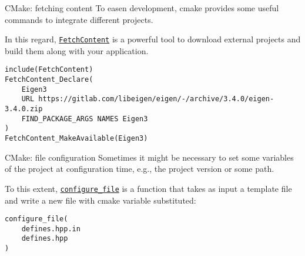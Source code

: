 \begin{frame}[fragile]{CMake: fetching content}
    To easen development, cmake provides some useful commands to integrate different projects.

    In this regard, \href{https://cmake.org/cmake/help/latest/module/FetchContent.html}{\texttt{FetchContent}} is a powerful tool to download external projects and build them along with your application.

\begin{lstlisting}
include(FetchContent)
FetchContent_Declare(
    Eigen3
    URL https://gitlab.com/libeigen/eigen/-/archive/3.4.0/eigen-3.4.0.zip
    FIND_PACKAGE_ARGS NAMES Eigen3
)
FetchContent_MakeAvailable(Eigen3)
\end{lstlisting}
\end{frame}

\begin{frame}[fragile]{CMake: file configuration}
    Sometimes it might be necessary to set some variables of the project at configuration time, e.g., the project version or some path.

    To this extent, \href{https://cmake.org/cmake/help/latest/module/FetchContent.html}{\texttt{configure\_file}} is a function that takes as input a template file and write a new file with cmake variable substituted:

\begin{lstlisting}
configure_file(
    defines.hpp.in
    defines.hpp
)
\end{lstlisting}
\end{frame}
